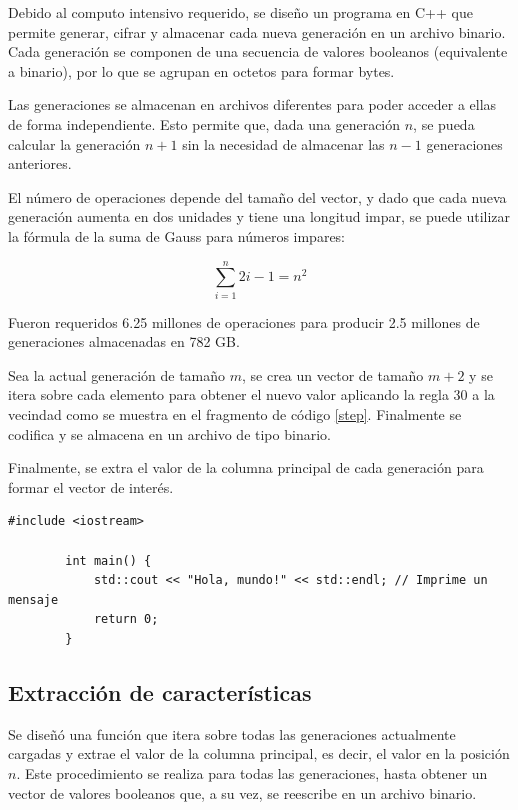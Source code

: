 \documentclass[12pt,twoside]{article}
\begin{document}
	Debido al computo intensivo requerido, se diseño un programa en C++ que permite generar, cifrar y almacenar cada nueva generación en un archivo binario. Cada generación se componen de una secuencia de valores booleanos (equivalente a binario), por lo que se agrupan en octetos para formar bytes.
	
	Las generaciones se almacenan en archivos diferentes para poder acceder a ellas de forma independiente. Esto permite que, dada una generación $n$, se pueda calcular la generación $n + 1$ sin la necesidad de almacenar las $n - 1$ generaciones anteriores. 
	
	El número de operaciones depende del tamaño del vector, y dado que cada nueva generación aumenta en dos unidades y tiene una longitud impar, se puede utilizar la fórmula de la suma de Gauss para números impares:
	
	\begin{equation*}
		\sum_{i = 1}^{n} 2i - 1 = n^2
	\end{equation*}
	
	Fueron requeridos 6.25 millones de operaciones para producir 2.5 millones de generaciones almacenadas en 782 GB.
	
	Sea la actual generación de tamaño $m$, se crea un vector de tamaño $m + 2$ y se itera sobre cada elemento para obtener el nuevo valor aplicando la regla 30 a la vecindad como se muestra en el fragmento de código \ref{step}. Finalmente se codifica y se almacena en un archivo de tipo binario.
	
	Finalmente, se extra el valor de la columna principal de cada generación para formar el vector de interés.
	
	\begin{lstlisting}[style=modernCpp, caption=Ejemplo de código en C++,  label=step]
		#include <iostream>
		
		int main() {
			std::cout << "Hola, mundo!" << std::endl; // Imprime un mensaje
			return 0;
		}
	\end{lstlisting}
	
	\subsection{Extracción de características}
	
	

	Se diseñó una función que itera sobre todas las generaciones actualmente cargadas y extrae el valor de la columna principal, es decir, el valor en la posición $n$. Este procedimiento se realiza para todas las generaciones, hasta obtener un vector de valores booleanos que, a su vez, se reescribe en un archivo binario.
	
\end{document}
